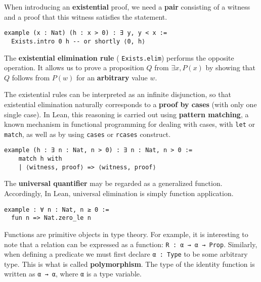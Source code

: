 \begin{example}
  When introducing an \textbf{existential} proof, 
  we need a \textbf{pair} consisting 
  of a witness and a proof that this witness 
  satisfies the statement.
  \begin{lstlisting}[language=lean]
example (x : Nat) (h : x > 0) : ∃ y, y < x :=
  Exists.intro 0 h -- or shortly ⟨0, h⟩
\end{lstlisting}
\end{example}
The \textbf{existential elimination rule} 
( \lstinline[language=lean]|Exists.elim|) performs the opposite operation. 
It allows us to prove a proposition $Q$ 
from $\exists x, P(x)$ by showing 
that $Q$  follows from $P(w)$  for an \textbf{arbitrary} 
value $w$.
\begin{example}
  The existential rules can be interpreted as an infinite 
  disjunction, 
  so that existential elimination naturally corresponds to a \textbf{proof by cases} (with only one single case). 
  In Lean, this reasoning is carried out using \textbf{pattern matching}, 
  a known mechanism in functional programming for dealing with cases,  
  with \lstinline[language=lean]|let| or \lstinline[language=lean]|match|, as well as by using \lstinline[language=lean]|cases| or 
  \lstinline[language=lean]|rcases| construct. 
  \begin{lstlisting}[language=lean]
  example (h : ∃ n : Nat, n > 0) : ∃ n : Nat, n > 0 :=
    match h with
    | ⟨witness, proof⟩ => ⟨witness, proof⟩
  \end{lstlisting}
\end{example}
\begin{example}
  The \textbf{universal quantifier} may be regarded as a generalized function.
Accordingly, In Lean, universal elimination is simply function application.
\begin{lstlisting}[language=lean]
example : ∀ n : Nat, n ≥ 0 :=
  fun n => Nat.zero_le n
\end{lstlisting}
\end{example}
Functions are primitive objects in type theory.
For example, it is interesting to note that a relation can be expressed as a function:
\lstinline[language=lean]|R : α → α → Prop|.
Similarly, when defining a predicate we must first declare 
\lstinline[language=lean]|α : Type| to be some arbitrary type. 
This is what is called \textbf{polymorphism}.
The type of the identity function is written as 
\lstinline[language=lean]|α → α|, where 
\lstinline[language=lean]|α| is a type variable. 
